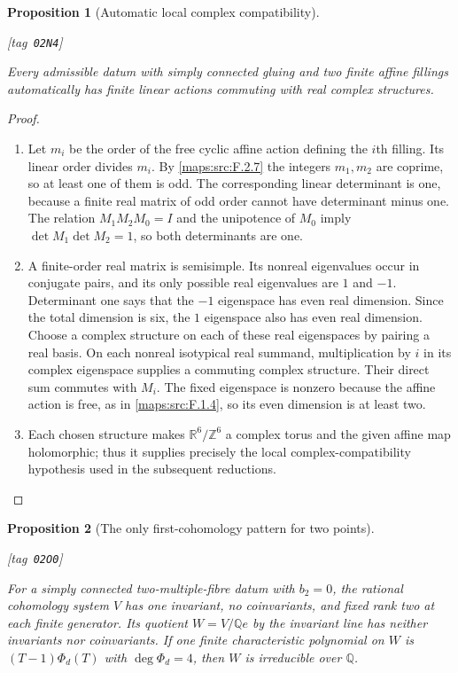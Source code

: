 \documentclass[11pt,a4paper]{article}
\numberwithin{equation}{section}
\newtheorem{proposition}[proposition]{Proposition}
\theoremstyle{definition}
\newcommand{\StatementRecord}[4]{{\upshape\footnotesize[tag~\texttt{#3}]}\enspace\ignorespaces}
\begin{document}
\begin{proposition}[Automatic local complex compatibility]\hypertarget{tag-02N4}{}\label{maps:src:F.2.15}
\StatementRecord{maps:src:F.2.15}{proved}{02N4}{\cref{maps:src:F.2.7}, \cref{maps:src:F.1.4}}


Every admissible datum with simply connected gluing and two finite affine fillings automatically has finite linear actions commuting
with real complex structures.

\end{proposition}


\begin{proof}
\begin{enumerate}[label=\arabic*.]
\item Let $m_i$ be the order of the free cyclic affine action
defining the $i$th filling.  Its linear order divides $m_i$.
By \ref{maps:src:F.2.7} the integers $m_1,m_2$ are coprime, so at least one
of them is odd.  The corresponding linear determinant is
one, because a finite real matrix of odd order cannot have
determinant minus one.  The relation
$M_1M_2M_0=I$ and the unipotence of $M_0$ imply
$\det M_1\det M_2=1$, so both determinants are one.

\item A finite-order real matrix is semisimple.  Its nonreal
eigenvalues occur in conjugate pairs, and its only possible
real eigenvalues are $1$ and $-1$.  Determinant one says
that the $-1$ eigenspace has even real dimension.  Since the
total dimension is six, the $1$ eigenspace also has even
real dimension.  Choose a complex structure on each of
these real eigenspaces by pairing a real basis.  On each
nonreal isotypical real summand, multiplication by $i$ in
its complex eigenspace supplies a commuting complex
structure.  Their direct sum commutes with $M_i$.
The fixed eigenspace is nonzero because the affine action
is free, as in \ref{maps:src:F.1.4}, so its even dimension is at least two.

\item Each chosen structure makes $\mathbb R^6/\mathbb Z^6$ a
complex torus and the given affine map holomorphic; thus it
supplies precisely the local complex-compatibility
hypothesis used in the subsequent reductions.

\end{enumerate}
\end{proof}

\begin{proposition}[The only first-cohomology pattern for two points]\hypertarget{tag-02O0}{}\label{maps:src:F.2.9}
\StatementRecord{maps:src:F.2.9}{proved}{02O0}{\cref{maps:src:F.3.1}, \cref{maps:src:F.2.15}}


For a simply connected two-multiple-fibre datum with $b_2=0$,
the rational
cohomology system $V$ has one invariant, no coinvariants,
and fixed rank two at each finite generator.  Its quotient
$W=V/\mathbb Qe$ by the invariant line has neither invariants
nor coinvariants.  If one finite characteristic polynomial
on $W$ is $(T-1)\Phi_d(T)$ with $\deg\Phi_d=4$, then $W$
is irreducible over $\mathbb Q$.

\end{proposition}
\end{document}
